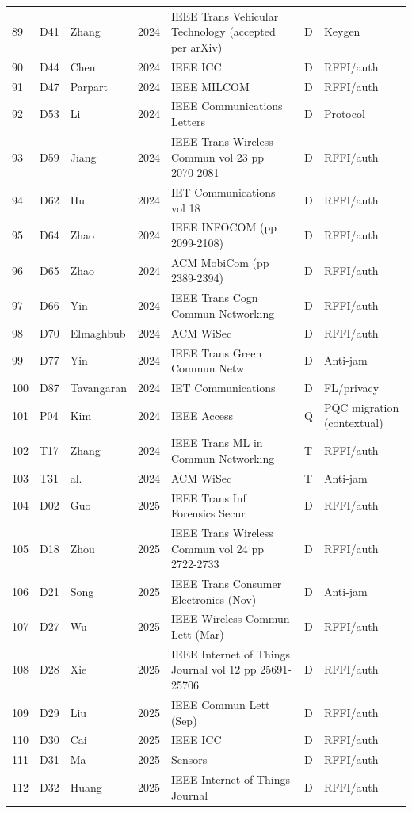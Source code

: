 \documentclass[10.5pt,compsoc,winfonts]{ICN}
\begin{document}
\begin{table}[p]
\begin{tabular}{@{}lllll>{\raggedright\arraybackslash}p{3.3cm}>{\raggedright\arraybackslash}p{1.9cm}@{}}
89 & D41 & Zhang & 2024 & IEEE Trans Vehicular Technology (accepted per arXiv) & D & Keygen \\
90 & D44 & Chen & 2024 & IEEE ICC & D & RFFI/auth \\
91 & D47 & Parpart & 2024 & IEEE MILCOM & D & RFFI/auth \\
92 & D53 & Li & 2024 & IEEE Communications Letters & D & Protocol \\
93 & D59 & Jiang & 2024 & IEEE Trans Wireless Commun vol 23 pp 2070-2081 & D & RFFI/auth \\
94 & D62 & Hu & 2024 & IET Communications vol 18 & D & RFFI/auth \\
95 & D64 & Zhao & 2024 & IEEE INFOCOM (pp 2099-2108) & D & RFFI/auth \\
96 & D65 & Zhao & 2024 & ACM MobiCom (pp 2389-2394) & D & RFFI/auth \\
97 & D66 & Yin & 2024 & IEEE Trans Cogn Commun Networking & D & RFFI/auth \\
98 & D70 & Elmaghbub & 2024 & ACM WiSec & D & RFFI/auth \\
99 & D77 & Yin & 2024 & IEEE Trans Green Commun Netw & D & Anti-jam \\
100 & D87 & Tavangaran & 2024 & IET Communications & D & FL/privacy \\
101 & P04 & Kim & 2024 & IEEE Access & Q & PQC migration (contextual) \\
102 & T17 & Zhang & 2024 & IEEE Trans ML in Commun Networking & T & RFFI/auth \\
103 & T31 & al. & 2024 & ACM WiSec & T & Anti-jam \\
104 & D02 & Guo & 2025 & IEEE Trans Inf Forensics Secur & D & RFFI/auth \\
105 & D18 & Zhou & 2025 & IEEE Trans Wireless Commun vol 24 pp 2722-2733 & D & RFFI/auth \\
106 & D21 & Song & 2025 & IEEE Trans Consumer Electronics (Nov) & D & Anti-jam \\
107 & D27 & Wu & 2025 & IEEE Wireless Commun Lett (Mar) & D & RFFI/auth \\
108 & D28 & Xie & 2025 & IEEE Internet of Things Journal vol 12 pp 25691-25706 & D & RFFI/auth \\
109 & D29 & Liu & 2025 & IEEE Commun Lett (Sep) & D & RFFI/auth \\
110 & D30 & Cai & 2025 & IEEE ICC & D & RFFI/auth \\
111 & D31 & Ma & 2025 & Sensors & D & RFFI/auth \\
112 & D32 & Huang & 2025 & IEEE Internet of Things Journal & D & RFFI/auth \\

\end{tabular}
\end{table}
\end{document}
